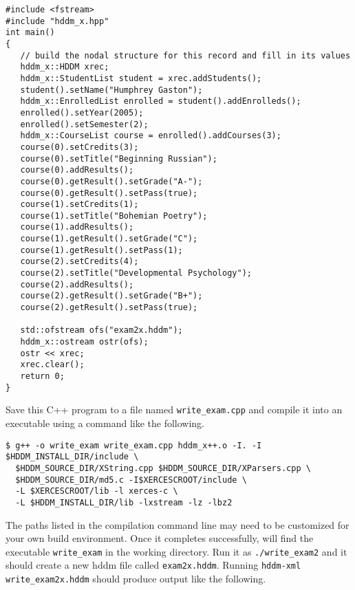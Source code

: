 \documentclass{revtex4}
\begin{document}
\vspace{0.5cm}
\begin{minipage}{12cm}
\begin{verbatim}
#include <fstream>
#include "hddm_x.hpp"
int main()
{
   // build the nodal structure for this record and fill in its values
   hddm_x::HDDM xrec;
   hddm_x::StudentList student = xrec.addStudents();
   student().setName("Humphrey Gaston");
   hddm_x::EnrolledList enrolled = student().addEnrolleds();
   enrolled().setYear(2005);
   enrolled().setSemester(2);
   hddm_x::CourseList course = enrolled().addCourses(3);
   course(0).setCredits(3);
   course(0).setTitle("Beginning Russian");
   course(0).addResults();
   course(0).getResult().setGrade("A-");
   course(0).getResult().setPass(true);
   course(1).setCredits(1);
   course(1).setTitle("Bohemian Poetry");
   course(1).addResults();
   course(1).getResult().setGrade("C");
   course(1).getResult().setPass(1);
   course(2).setCredits(4);
   course(2).setTitle("Developmental Psychology");
   course(2).addResults();
   course(2).getResult().setGrade("B+");
   course(2).getResult().setPass(true);

   std::ofstream ofs("exam2x.hddm");
   hddm_x::ostream ostr(ofs);
   ostr << xrec;
   xrec.clear();
   return 0;
}
\end{verbatim}
\end{minipage}
\vspace{0.5cm}

Save this C++ program to a file named \texttt{write\_exam.cpp} and compile it 
into an executable using a command like the following.

\vspace{0.5cm}
\begin{minipage}{12cm}
\begin{verbatim}
$ g++ -o write_exam write_exam.cpp hddm_x++.o -I. -I $HDDM_INSTALL_DIR/include \
  $HDDM_SOURCE_DIR/XString.cpp $HDDM_SOURCE_DIR/XParsers.cpp \
  $HDDM_SOURCE_DIR/md5.c -I$XERCESCROOT/include \
  -L $XERCESCROOT/lib -l xerces-c \
  -L $HDDM_INSTALL_DIR/lib -lxstream -lz -lbz2
\end{verbatim}
\end{minipage}
\vspace{0.5cm}

The paths listed in the compilation command line may need to be customized
for your own build environment. Once it completes successfully, will find
the executable \texttt{write\_exam} in the working directory. Run it as
\texttt{./write\_exam2} and it should create a new hddm file called 
\texttt{exam2x.hddm}. Running \texttt{hddm-{}xml write\_exam2x.hddm}
should produce output like the following.
\end{document}
